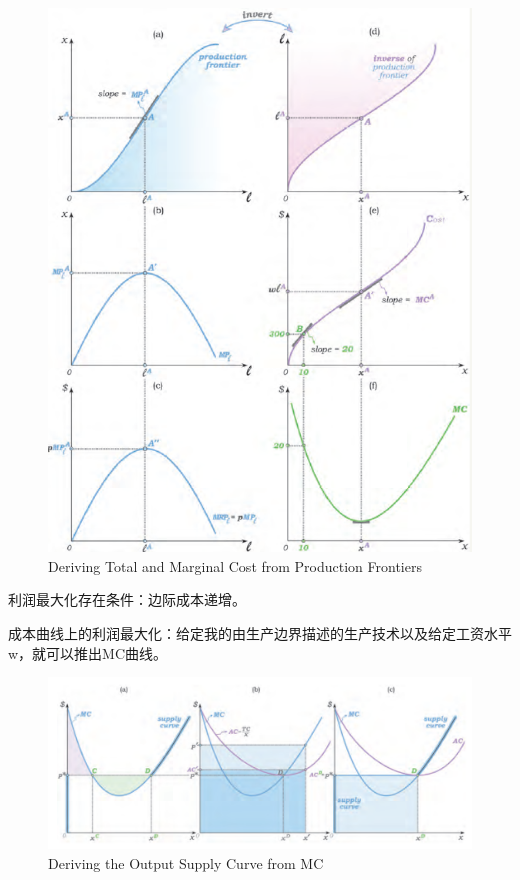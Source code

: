\documentclass{article}
\begin{document}
\begin{figure}[H] %
	\centering %
	\includegraphics[width=1\textwidth]{11_8} %
	\caption{Deriving Total and Marginal Cost from Production Frontiers} %
	\label{Fig.main9} %
\end{figure}

利润最大化存在条件：边际成本递增。

成本曲线上的利润最大化：给定我的由生产边界描述的生产技术以及给定工资水平w，就可以推出MC曲线。

\begin{figure}[H] %
	\centering %
	\includegraphics[width=1\textwidth]{11_9} %
	\caption{Deriving the Output Supply Curve from MC} %
	\label{Fig.main10} %
\end{figure}
\end{document}
